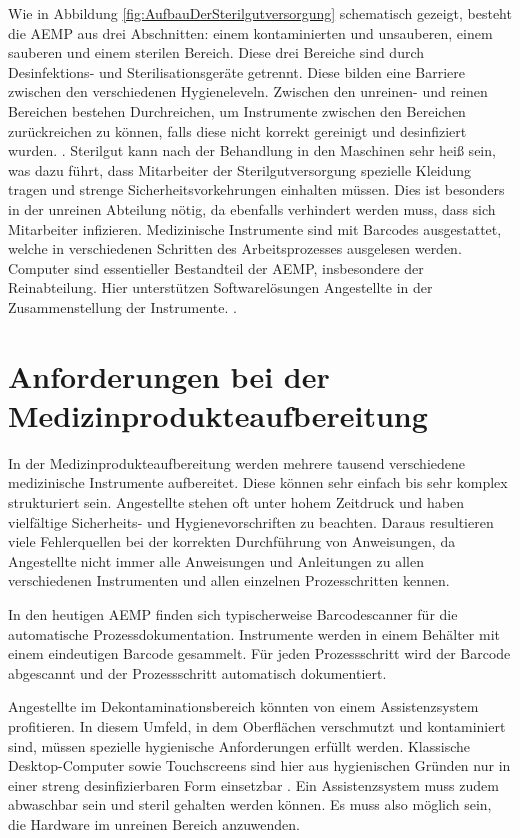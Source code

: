 Wie in Abbildung \ref{fig:AufbauDerSterilgutversorgung} schematisch gezeigt, besteht die AEMP aus drei Abschnitten: einem kontaminierten und unsauberen, einem sauberen und einem sterilen Bereich. Diese drei Bereiche sind durch Desinfektions- und Sterilisationsgeräte getrennt. Diese bilden eine Barriere zwischen den verschiedenen Hygieneleveln. Zwischen den unreinen- und reinen Bereichen bestehen Durchreichen, um Instrumente zwischen den Bereichen zurückreichen zu können, falls diese nicht korrekt gereinigt und desinfiziert wurden. \cite[S.~24]{Ruther2014}. Sterilgut kann nach der Behandlung in den Maschinen sehr heiß sein, was dazu führt, dass Mitarbeiter der Sterilgutversorgung spezielle Kleidung tragen und strenge Sicherheitsvorkehrungen einhalten müssen. Dies ist besonders in der unreinen Abteilung nötig, da ebenfalls verhindert werden muss, dass sich Mitarbeiter infizieren. Medizinische Instrumente sind mit Barcodes ausgestattet, welche in verschiedenen Schritten des Arbeitsprozesses ausgelesen werden. Computer sind essentieller Bestandteil der AEMP, insbesondere der Reinabteilung. Hier unterstützen Softwarelösungen Angestellte in der Zusammenstellung der Instrumente. \cite[S.~25]{Ruther2014}.
%
%
%
%
%
%
\section{Anforderungen bei der Medizinprodukteaufbereitung}
\label{sec:Anforderungen_bei_der_Medizinprodukteaufbereitung}
In der Medizinprodukteaufbereitung werden mehrere tausend verschiedene medizinische Instrumente aufbereitet. Diese können sehr einfach bis sehr komplex strukturiert sein. Angestellte stehen oft unter hohem Zeitdruck und haben  vielfältige Sicherheits- und Hygienevorschriften zu beachten. Daraus resultieren viele Fehlerquellen bei der korrekten Durchführung von Anweisungen, da Angestellte nicht immer alle Anweisungen und Anleitungen zu allen verschiedenen Instrumenten und allen einzelnen Prozesschritten kennen.

In den heutigen AEMP finden sich typischerweise Barcodescanner für die automatische Prozessdokumentation. Instrumente werden in einem Behälter mit einem eindeutigen Barcode gesammelt. Für jeden Prozessschritt wird der Barcode abgescannt und der Prozessschritt automatisch dokumentiert.

Angestellte im Dekontaminationsbereich könnten von einem Assistenzsystem profitieren. 
In diesem Umfeld, in dem Oberflächen verschmutzt und kontaminiert sind, müssen spezielle hygienische Anforderungen erfüllt werden. Klassische Desktop-Computer sowie Touchscreens sind hier aus hygienischen Gründen nur in einer streng desinfizierbaren Form einsetzbar \cite[S.~28]{Ruther2014}. Ein Assistenzsystem muss zudem abwaschbar sein und steril gehalten werden können. Es muss also möglich sein, die Hardware im unreinen Bereich anzuwenden. 

